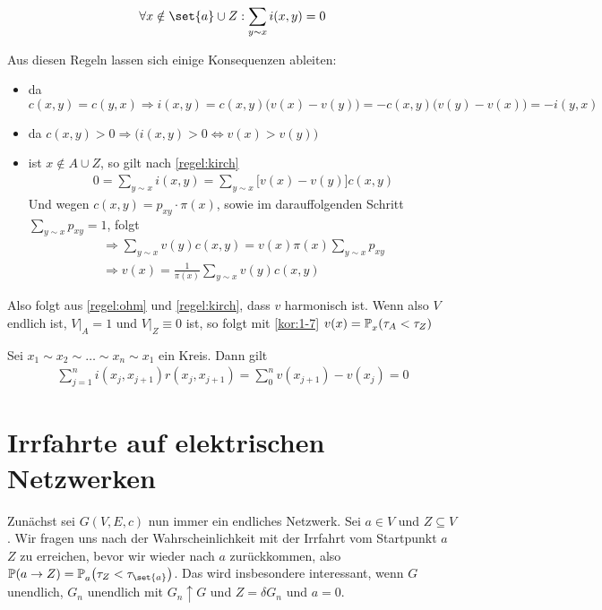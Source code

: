 \begin{regel}
	\label{regel:kirch}
	\begin{align}
		\forall x \notin \set{a} \cup Z: \sum\limits_{y \sim x} i(x,y) = 0
	\end{align}
\end{regel}

Aus diesen Regeln lassen sich einige Konsequenzen ableiten:
\begin{itemize}
	\item da $c(x,y) = c(y,x) \Rightarrow i(x,y) = c(x,y)\big(v(x) -v(y)\big) = -c(x,y)\big(v(y)- v(x)\big) = - i(y,x)$
	\item da $c(x,y) > 0 \Rightarrow \Big({i(x,y) > 0 \Leftrightarrow v(x) > v(y)}\Big)$
	\item ist $x \notin A \cup Z$, so gilt nach \ref{regel:kirch} 
		\begin{align}
			0 = \sum\limits_{y \sim x} i(x,y) = \sum\limits_{y \sim x} \big[v(x)-v(y)\big]c(x,y)
		\end{align}
		Und wegen $c(x,y) = p_{xy} \cdot \pi(x)$, sowie im darauffolgenden Schritt $\sum\limits_{y \sim x} p_{xy} = 1$, folgt
		\begin{align}
			\Rightarrow \sum\limits_{y\sim x} v(y)c(x,y) = v(x)\pi(x) \sum\limits_{y \sim x} p_{xy} \\
			\Rightarrow v(x) = \frac{1}{\pi(x)} \sum\limits_{y \sim x} v(y) c(x,y)
		\end{align}
\end{itemize}
Also folgt aus \ref{regel:ohm} und \ref{regel:kirch}, dass $v$ harmonisch ist. Wenn also $V$ endlich ist, $V|_A = 1$ und $V|_Z \equiv 0$ ist, so folgt mit \ref{kor:1-7} $v(x) = \prop{\tau_A < \tau_Z}[][x]$

\begin{korollar}
	Sei $x_1 \sim x_2 \sim \dots \sim x_n \sim x_1$ ein Kreis. Dann gilt 
	\begin{align}
		\sum\limits_{j=1}^{n}i(x_j,x_{j+1})r(x_j,x_{j+1}) = \sum\limits_{0}^{n}v(x_{j+1}) - v(x_j) = 0
	\end{align}
\end{korollar}

\section{Irrfahrte auf elektrischen Netzwerken}
Zunächst sei $G(V,E,c)$ nun immer ein endliches Netzwerk. Sei $a \in V$ und $Z \subseteq V$. Wir fragen uns nach der Wahrscheinlichkeit mit der Irrfahrt vom Startpunkt $a$ $Z$ zu erreichen, bevor wir wieder nach $a$ zurückkommen, also $\prop{a \to Z} = \prop{\tau_Z < \tau_{\set{a}}}[][a]$. Das wird insbesondere interessant, wenn $G$ unendlich, $G_n$ unendlich mit $G_n \uparrow G$ und  $Z = \delta G_n$ und $a=0$.

